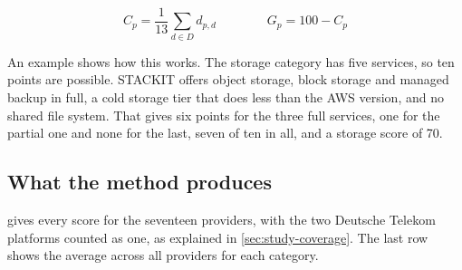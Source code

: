 \begin{equation}
  \label{eq:readiness-coverage}
  C_p = \frac{1}{13}\sum_{d \in D} d_{p,d}
  \qquad\qquad
  G_p = 100 - C_p
\end{equation}

An example shows how this works. The storage category has five services, so ten
points are possible. STACKIT offers object storage, block storage and managed backup
in full, a cold storage tier that does less than the \acs{AWS} version, and no shared
file system. That gives six points for the three full services, one for the partial
one and none for the last, seven of ten in all, and a storage score of 70.

\subsection*{What the method produces}

 gives every score for the seventeen providers, with the
two Deutsche Telekom platforms counted as one, as explained in
\cref{sec:study-coverage}. The last row shows the average across all providers for
each category.

